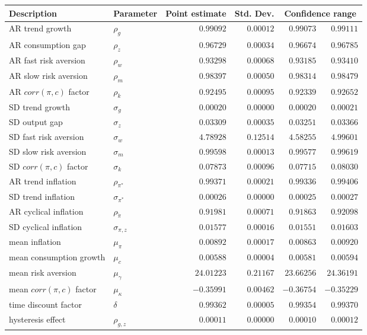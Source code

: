 \begin{tabular}{llrrrr} \hline Description & Parameter & Point estimate & Std. Dev. & \multicolumn{2}{c}{Confidence range} \\ \hline AR trend growth & $\rho_g$ & $0.99092$ & $0.00012$ & $0.99073$ & $0.99111$ \\ AR consumption gap & $\rho_z$ & $0.96729$ & $0.00034$ & $0.96674$ & $0.96785$ \\ AR fast risk aversion & $\rho_w$ & $0.93298$ & $0.00068$ & $0.93185$ & $0.93410$ \\ AR slow risk aversion & $\rho_m$ & $0.98397$ & $0.00050$ & $0.98314$ & $0.98479$ \\ AR $corr(\pi,c)$ factor & $\rho_k$ & $0.92495$ & $0.00095$ & $0.92339$ & $0.92652$ \\ SD trend growth & $\sigma_g$ & $0.00020$ & $0.00000$ & $0.00020$ & $0.00021$ \\ SD output gap & $\sigma_z$ & $0.03309$ & $0.00035$ & $0.03251$ & $0.03366$ \\ SD fast risk aversion & $\sigma_w$ & $4.78928$ & $0.12514$ & $4.58255$ & $4.99601$ \\ SD slow risk aversion & $\sigma_m$ & $0.99598$ & $0.00013$ & $0.99577$ & $0.99619$ \\ SD $corr(\pi,c)$ factor & $\sigma_k$ & $0.07873$ & $0.00096$ & $0.07715$ & $0.08030$ \\ AR trend inflation & $\rho_{\pi^*}$ & $0.99371$ & $0.00021$ & $0.99336$ & $0.99406$ \\ SD trend inflation & $\sigma_{\pi^*}$ & $0.00026$ & $0.00000$ & $0.00025$ & $0.00027$ \\ AR cyclical inflation & $\rho_{\tilde{\pi}}$ & $0.91981$ & $0.00071$ & $0.91863$ & $0.92098$ \\ SD cyclical inflation & $\sigma_{\pi,z}$ & $0.01577$ & $0.00016$ & $0.01551$ & $0.01603$ \\ mean inflation & $\mu_\pi$ & $0.00892$ & $0.00017$ & $0.00863$ & $0.00920$ \\ mean consumption growth & $\mu_c$ & $0.00588$ & $0.00004$ & $0.00581$ & $0.00594$ \\ mean risk aversion & $\mu_\gamma$ & $24.01223$ & $0.21167$ & $23.66256$ & $24.36191$ \\ mean $corr(\pi,c)$ factor & $\mu_\kappa$ & $-0.35991$ & $0.00462$ & $-0.36754$ & $-0.35229$ \\ time discount factor & $\delta$ & $0.99362$ & $0.00005$ & $0.99354$ & $0.99370$ \\ hysteresis effect & $\rho_{g,z}$ & $0.00011$ & $0.00000$ & $0.00010$ & $0.00012$ \\  \hline  \end{tabular}
